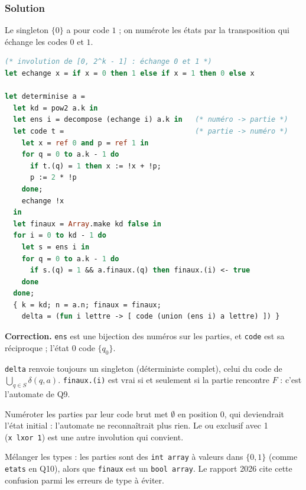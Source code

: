 \documentclass[11pt,a4paper]{article}
\begin{document}
\hypertarget{solution-10}{%
\subsubsection{Solution}\label{solution-10}}

Le singleton \(\{0\}\) a pour code \(1\) ; on numérote les états par la transposition qui échange les codes \(0\) et \(1\).

\begin{lstlisting}[language=Caml]
(* involution de [0, 2^k - 1] : échange 0 et 1 *)
let echange x = if x = 0 then 1 else if x = 1 then 0 else x

let determinise a =
  let kd = pow2 a.k in
  let ens i = decompose (echange i) a.k in   (* numéro -> partie *)
  let code t =                               (* partie -> numéro *)
    let x = ref 0 and p = ref 1 in
    for q = 0 to a.k - 1 do
      if t.(q) = 1 then x := !x + !p;
      p := 2 * !p
    done;
    echange !x
  in
  let finaux = Array.make kd false in
  for i = 0 to kd - 1 do
    let s = ens i in
    for q = 0 to a.k - 1 do
      if s.(q) = 1 && a.finaux.(q) then finaux.(i) <- true
    done
  done;
  { k = kd; n = a.n; finaux = finaux;
    delta = (fun i lettre -> [ code (union (ens i) a lettre) ]) }
\end{lstlisting}

\textbf{Correction.} \texttt{ens} est une bijection des numéros sur les parties, et \texttt{code} est sa réciproque ; l'état \(0\) code \(\{q_0\}\).

\texttt{delta} renvoie toujours un singleton (déterministe complet), celui du code de \(\bigcup_{q\in S}\delta(q,a)\). \texttt{finaux.(i)} est vrai si et seulement si la partie rencontre \(F\) : c'est l'automate de Q9.

\begin{piege}

Numéroter les parties par leur code brut met \(\emptyset\) en position 0, qui deviendrait l'état initial : l'automate ne reconnaîtrait plus rien. Le ou exclusif avec 1 (\texttt{x\ lxor\ 1}) est une autre involution qui convient.

\end{piege}

\begin{piege}

Mélanger les types : les parties sont des \texttt{int\ array} à valeurs dans \(\{0,1\}\) (comme \texttt{etats} en Q10), alors que \texttt{finaux} est un \texttt{bool\ array}. Le rapport 2026 cite cette confusion parmi les erreurs de type à éviter.

\end{piege}
\end{document}
